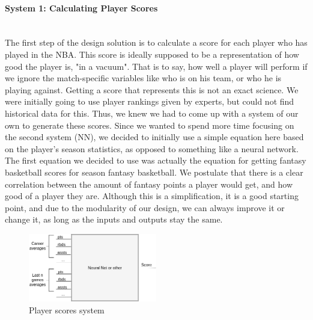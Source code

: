 \paragraph{System 1: Calculating Player Scores}\mbox{}\\
The first step of the design solution is to calculate a score for each player who has played in the NBA. This score is ideally supposed to be a representation of how good the player is, "in a vacuum". That is to say, how well a player will perform if we ignore the match-specific variables like who is on his team, or who he is playing against. Getting a score that represents this is not an exact science. We were initially going to use player rankings given by experts, but could not find historical data for this. Thus, we knew we had to come up with a system of our own to generate these scores. Since we wanted to spend more time focusing on the second system (NN), we decided to initially use a simple equation here based on the player's season statistics, as opposed to something like a neural network. The first equation we decided to use was actually the equation for getting fantasy basketball scores for season fantasy basketball. We postulate that there is a clear correlation between the amount of fantasy points a player would get, and how good of a player they are. Although this is a simplification, it is a good starting point, and due to the modularity of our design, we can always improve it or change it, as long as the inputs and outputs stay the same. 
\begin{figure}[ht]
    \centering
    \includegraphics[width=0.5\textwidth]{figures/player_scores}
    \caption{Player scores system}
    \label{fig:player_scores}
\end{figure}

